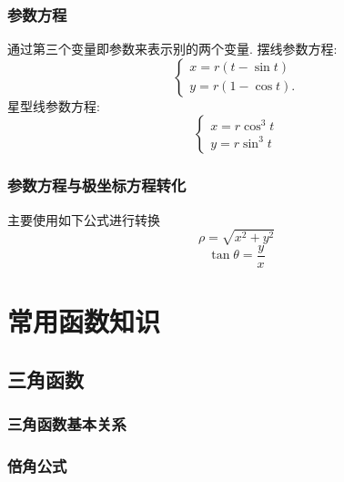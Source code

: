 \documentclass[8pt a4paper, oneside, UTF8]{ctexbook}  %
\begin{document}
\begin{sloppypar}
    \subsubsection{参数方程}
    通过第三个变量即参数来表示别的两个变量.
    摆线参数方程:
    $$
        \left\{
        \begin{array}{l}
            x=r\left(t-\sin t\right) \\
            y=r\left(1-\cos t\right).
        \end{array}
        \right.
    $$
    星型线参数方程:
    $$
        \left\{
        \begin{array}{l}
            x=r \cos^3 t \\
            y=r \sin^3 t
        \end{array}
        \right.
    $$
    \subsubsection{参数方程与极坐标方程转化}
    主要使用如下公式进行转换
    $$
        \rho=\sqrt{x^2+y^2}
    $$
    $$
        \tan\theta=\dfrac yx
    $$
    \section{常用函数知识}
    \subsection{三角函数}
    \subsubsection{三角函数基本关系}
    \begin{center}
    \end{center}
    \subsubsection{倍角公式}
    \begin{center}
    \end{center}

\end{sloppypar}
\end{document}
